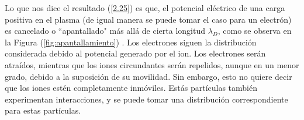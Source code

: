 \documentclass[../main.tex]{subfiles}
\begin{document}
    Lo que nos dice el resultado (\ref{2.25}) es que, el potencial eléctrico de una carga positiva en el plasma (de igual manera se puede tomar el caso 
    para un electrón) es cancelado o ``apantallado" más allá de cierta longitud $\lambda_D$, como se observa en la Figura (\ref{fig:apantallamiento}) . Los electrones siguen la distribución considerada debido al potencial generado por el ion. Los electrones serán atraídos, mientras que los iones circundantes serán repelidos, aunque en un menor grado, debido a la suposición de su movilidad.   Sin embargo, esto no quiere decir que los iones estén completamente 
    inmóviles. Estás partículas también experimentan interacciones, y se puede tomar una distribución correspondiente
    para estas partículas. \\

\end{document}
